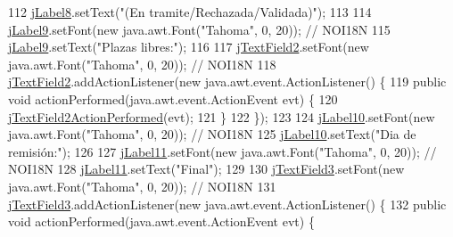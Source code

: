 \begin{DoxyCode}
112         \mbox{\hyperlink{classsoftware_1_1parasoftware3_aa6b9c08a2dd3c58649ccab6707950e45}{jLabel8}}.setText(\textcolor{stringliteral}{"(En tramite/Rechazada/Validada)"});
113 
114         \mbox{\hyperlink{classsoftware_1_1parasoftware3_ac84a161604551842c24b960457e78a4e}{jLabel9}}.setFont(\textcolor{keyword}{new} java.awt.Font(\textcolor{stringliteral}{"Tahoma"}, 0, 20)); \textcolor{comment}{// NOI18N}
115         \mbox{\hyperlink{classsoftware_1_1parasoftware3_ac84a161604551842c24b960457e78a4e}{jLabel9}}.setText(\textcolor{stringliteral}{"Plazas libres:"});
116 
117         \mbox{\hyperlink{classsoftware_1_1parasoftware3_a420e41087126364b3392b21a69724347}{jTextField2}}.setFont(\textcolor{keyword}{new} java.awt.Font(\textcolor{stringliteral}{"Tahoma"}, 0, 20)); \textcolor{comment}{// NOI18N}
118         \mbox{\hyperlink{classsoftware_1_1parasoftware3_a420e41087126364b3392b21a69724347}{jTextField2}}.addActionListener(\textcolor{keyword}{new} java.awt.event.ActionListener() \{
119             \textcolor{keyword}{public} \textcolor{keywordtype}{void} actionPerformed(java.awt.event.ActionEvent evt) \{
120                 \mbox{\hyperlink{classsoftware_1_1parasoftware3_a2ff1159c69e5fefd7c2582b2e14db77a}{jTextField2ActionPerformed}}(evt);
121             \}
122         \});
123 
124         \mbox{\hyperlink{classsoftware_1_1parasoftware3_ac2e16b2c38aefb461c2f0eced858c1fd}{jLabel10}}.setFont(\textcolor{keyword}{new} java.awt.Font(\textcolor{stringliteral}{"Tahoma"}, 0, 20)); \textcolor{comment}{// NOI18N}
125         \mbox{\hyperlink{classsoftware_1_1parasoftware3_ac2e16b2c38aefb461c2f0eced858c1fd}{jLabel10}}.setText(\textcolor{stringliteral}{"Dia de remisión:"});
126 
127         \mbox{\hyperlink{classsoftware_1_1parasoftware3_ab18f2dadd065ca433f08c878d3ff2b49}{jLabel11}}.setFont(\textcolor{keyword}{new} java.awt.Font(\textcolor{stringliteral}{"Tahoma"}, 0, 20)); \textcolor{comment}{// NOI18N}
128         \mbox{\hyperlink{classsoftware_1_1parasoftware3_ab18f2dadd065ca433f08c878d3ff2b49}{jLabel11}}.setText(\textcolor{stringliteral}{"Final"});
129 
130         \mbox{\hyperlink{classsoftware_1_1parasoftware3_a19c3b86c1d29a59d3e2dca7ca6e34e35}{jTextField3}}.setFont(\textcolor{keyword}{new} java.awt.Font(\textcolor{stringliteral}{"Tahoma"}, 0, 20)); \textcolor{comment}{// NOI18N}
131         \mbox{\hyperlink{classsoftware_1_1parasoftware3_a19c3b86c1d29a59d3e2dca7ca6e34e35}{jTextField3}}.addActionListener(\textcolor{keyword}{new} java.awt.event.ActionListener() \{
132             \textcolor{keyword}{public} \textcolor{keywordtype}{void} actionPerformed(java.awt.event.ActionEvent evt) \{

\end{DoxyCode}
